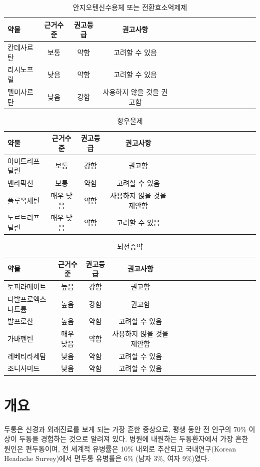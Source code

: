 \documentclass[]{book}
\begin{document}
\begin{longtable}{lccclccclccclccc}
\caption{\label{tab:unnamed-chunk-4}안지오텐신수용체 또는 전환효소억제제}\\
\toprule
약물 & 근거수준 & 권고등급 & 권고사항\\
\midrule
칸데사르탄 & 보통 & 약함 & 고려할 수 있음\\
리시노프릴 & 낮음 & 약함 & 고려할 수 있음\\
텔미사르탄 & 낮음 & 강함 & 사용하지 않을 것을 권고함\\
\bottomrule
\end{longtable}

\begin{longtable}{lccclccclccclccc}
\caption{\label{tab:unnamed-chunk-5}항우울제}\\
\toprule
약물 & 근거수준 & 권고등급 & 권고사항\\
\midrule
아미트리프틸린 & 보통 & 강함 & 권고함\\
벤라팍신 & 보통 & 약함 & 고려할 수 있음\\
플루옥세틴 & 매우 낮음 & 약함 & 사용하지 않을 것을 제안함\\
노르트리프틸린 & 매우 낮음 & 약함 & 고려할 수 있음\\
\bottomrule
\end{longtable}

\begin{longtable}{lccclccclccclccc}
\caption{\label{tab:unnamed-chunk-6}뇌전증약}\\
\toprule
약물 & 근거수준 & 권고등급 & 권고사항\\
\midrule
토피라메이트 & 높음 & 강함 & 권고함\\
디발프로엑스나트륨 & 높음 & 강함 & 권고함\\
발프로산 & 높음 & 약함 & 고려할 수 있음\\
가바펜틴 & 매우 낮음 & 약함 & 사용하지 않을 것을 제안함\\
레베티라세탐 & 낮음 & 약함 & 고려할 수 있음\\
\addlinespace
조니사미드 & 낮음 & 약함 & 고려할 수 있음\\
\bottomrule
\end{longtable}

\hypertarget{section-5}{%
\chapter{개요}\label{section-5}}

두통은 신경과 외래진료를 보게 되는 가장 흔한 증상으로, 평생 동안 전 인구의 70\% 이상이 두통을 경험하는 것으로 알려져 있다. 병원에 내원하는 두통환자에서 가장 흔한 원인은 편두통이며, 전 세계적 유병률은 10\% 내외로 추산되고 국내연구(Korean Headache Survey)에서 편두통 유병률은 6\% (남자 3\%, 여자 9\%)였다.
\end{document}
